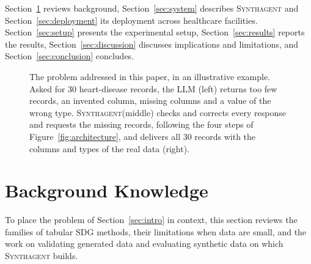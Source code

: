 \documentclass[conference]{IEEEtran}
\newcommand{\system}{\textsc{Synthagent}\xspace}
\begin{document}
Section~\ref{sec:related} reviews background, Section~\ref{sec:system} describes \system and Section~\ref{sec:deployment} its deployment across healthcare facilities. Section~\ref{sec:setup} presents the experimental setup, Section~\ref{sec:results} reports the results, Section~\ref{sec:discussion} discusses implications and limitations, and Section~\ref{sec:conclusion} concludes.

\begin{figure}[t]
\centering
\resizebox{\columnwidth}{!}{}
\caption{The problem addressed in this paper, in an illustrative example. Asked for 30 heart-disease records, the LLM (left) returns too few records, an invented column, missing columns and a value of the wrong type. \system (middle) checks and corrects every response and requests the missing records, following the four steps of Figure~\ref{fig:architecture}, and delivers all 30 records with the columns and types of the real data (right).}
\label{fig:teaser}
\end{figure}

\section{Background Knowledge}
\label{sec:related}
To place the problem of Section~\ref{sec:intro} in context, this section reviews the families of tabular SDG methods, their limitations when data are small, and the work on validating generated data and evaluating synthetic data on which \system builds.
\end{document}
